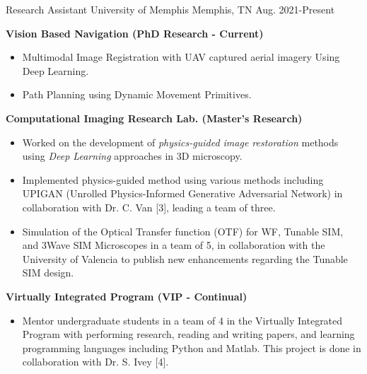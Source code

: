 

\begin{cventries}

  \cventry
    {Research Assistant} %
    {University of Memphis} %
    {Memphis, TN} %
    {Aug. 2021-Present} %
    {
      \begin{cvitems} %
      \item{\textbf{Vision Based Navigation (PhD Research - Current)}}
      \begin{itemize}[label= - ]
                \item Multimodal Image Registration with UAV captured aerial imagery Using Deep Learning.
                \item Path Planning using Dynamic Movement Primitives.
        \end{itemize}   
      \item{\textbf{Computational Imaging Research Lab. (Master's Research)}}
      \begin{itemize}[label= - ]
                \item{Worked on the development of \textit{physics-guided image restoration} methods using \textit{Deep Learning} approaches in 3D microscopy.}
                \item{Implemented physics-guided method using various methods including UPIGAN (Unrolled Physics-Informed Generative Adversarial Network) in collaboration with Dr. C. Van [3], leading a team of three.}
              \item{Simulation of the Optical Transfer function (OTF) for WF, Tunable SIM, and 3Wave SIM Microscopes in a team of 5, in collaboration with the University of Valencia to publish new enhancements regarding the Tunable SIM design.}
        \end{itemize}    
        \item{\textbf{Virtually Integrated Program (VIP - Continual)}}
        \begin{itemize}
              \item {Mentor undergraduate students in a team of 4 in the Virtually Integrated Program with performing research, reading and writing papers, and learning programming languages including Python and Matlab. This project is done in collaboration with Dr. S. Ivey [4].}

\end{itemize}
\end{cvitems}}
\end{cventries}
